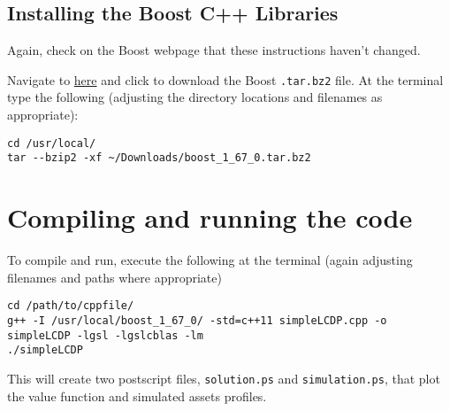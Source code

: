 \documentclass[12pt]{article}
\begin{document}
\subsection{Installing the Boost C++ Libraries}

Again, check on the Boost webpage that these instructions haven't changed.

Navigate to \href{https://www.boost.org/doc/libs/1_68_0/more/getting_started/unix-variants.html}{here} and click to download the Boost \texttt{.tar.bz2} file. At the terminal type the following (adjusting the directory locations and filenames as appropriate):
\begin{lstlisting}
cd /usr/local/
tar --bzip2 -xf ~/Downloads/boost_1_67_0.tar.bz2 
\end{lstlisting}

\section{Compiling and running the code}

To compile and run, execute the following at the terminal (again adjusting filenames and paths where appropriate)
\begin{lstlisting}
cd /path/to/cppfile/
g++ -I /usr/local/boost_1_67_0/ -std=c++11 simpleLCDP.cpp -o simpleLCDP -lgsl -lgslcblas -lm
./simpleLCDP
\end{lstlisting}
This will create two postscript files, \texttt{solution.ps} and \texttt{simulation.ps}, that plot the value function and simulated assets profiles.
\end{document}
